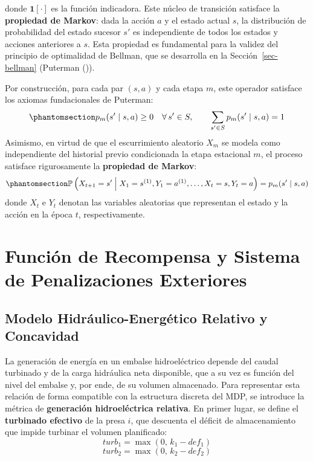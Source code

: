 \documentclass[
  spanish,
  letterpaper,
]{scrreprt}
\theoremstyle{definition}
\theoremstyle{remark}
\begin{document}
donde \(\mathbf{1}[\cdot]\) es la función indicadora. Este núcleo de
transición satisface la \textbf{propiedad de Markov}: dada la acción
\(a\) y el estado actual \(s\), la distribución de probabilidad del
estado sucesor \(s'\) es independiente de todos los estados y acciones
anteriores a \(s\). Esta propiedad es fundamental para la validez del
principio de optimalidad de Bellman, que se desarrolla en la
Sección~\ref{sec-bellman} (Puterman
()).

Por construcción, para cada par \((s, a)\) y cada etapa \(m\), este
operador satisface los axiomas fundacionales de Puterman:
\begin{equation}\protect\phantomsection\label{eq-axiomas-puterman-prob}{
p_m(s' \mid s, a) \ge 0 \quad \forall\, s' \in S, \qquad \sum_{s' \in S} p_m(s' \mid s, a) = 1
}\end{equation} Asimismo, en virtud de que el escurrimiento aleatorio
\(X_m\) se modela como independiente del historial previo condicionada
la etapa estacional \(m\), el proceso satisface rigurosamente la
\textbf{propiedad de Markov}:
\begin{equation}\protect\phantomsection\label{eq-propiedad-markov}{
\mathbb{P}\left(X_{t+1} = s' \;\middle|\; X_1 = s^{(1)}, Y_1 = a^{(1)}, \ldots, X_t = s, Y_t = a\right) = p_m(s' \mid s, a)
}\end{equation} donde \(X_t\) e \(Y_t\) denotan las variables aleatorias
que representan el estado y la acción en la época \(t\),
respectivamente.

\section{Función de Recompensa y Sistema de Penalizaciones
Exteriores}\label{sec-recompensa}

\subsection{Modelo Hidráulico-Energético Relativo y
Concavidad}\label{modelo-hidruxe1ulico-energuxe9tico-relativo-y-concavidad}

La generación de energía en un embalse hidroeléctrico depende del caudal
turbinado y de la carga hidráulica neta disponible, que a su vez es
función del nivel del embalse y, por ende, de su volumen almacenado.
Para representar esta relación de forma compatible con la estructura
discreta del MDP, se introduce la métrica de \textbf{generación
hidroeléctrica relativa}. En primer lugar, se define el
\textbf{turbinado efectivo} de la presa \(i\), que descuenta el déficit
de almacenamiento que impide turbinar el volumen planificado:
\[turb_1 = \max(0, \, k_1 - def_1)\]
\[turb_2 = \max(0, \, k_2 - def_2)\]
\end{document}
